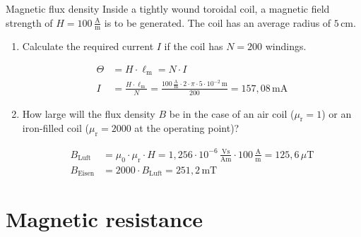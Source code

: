 \begin{frame} 
	\begin{expl}{Magnetic flux density}{}
        Inside a tightly wound toroidal coil, a magnetic field strength of $H=100\,\frac{\mathrm{A}}{\mathrm{m}}$ is to be generated. The coil has an average radius of $5\,\mathrm{cm}$.		\begin{enumerate}
			\item Calculate the required current $I$ if the coil has $N=200$ windings.\pause
			      
			      \begin{align*}
				      \varTheta & = H \cdot \ell_{\mathrm{m}} = N\cdot I                                                                                                                  \\
				      I         & =\frac{H\cdot\ell_{\mathrm{m}}}{N}=\frac{100\,\frac{\mathrm{A}}{\mathrm{m}}\cdot 2\cdot \pi\cdot 5\cdot 10^{-2}\,\mathrm{m}}{200} = 157,08\,\mathrm{mA}
			      \end{align*}\pause
			\item How large will the flux density $B$ be in the case of an air coil ($\mu_{\mathrm{r}}=1$) or an iron-filled coil ($\mu_{\mathrm{r}}=2000$ at the operating point)?\pause
			      
			      \begin{align*}
				      B_\mathrm{Luft}  & = \mu_0\cdot \mu_{\mathrm{r}}\cdot H = 1,256\cdot10^{-6}\,\tfrac{\mathrm{Vs}}{\mathrm{Am}} \cdot 100\,\tfrac{\mathrm{A}}{\mathrm{m}} = 125,6\,\mu\mathrm{T} \\
				      B_\mathrm{Eisen} & = 2000\cdot B_\mathrm{Luft} = 251,2\,\mathrm{mT}
			      \end{align*}
		\end{enumerate}
	\end{expl}
\end{frame}

\section{Magnetic resistance}

